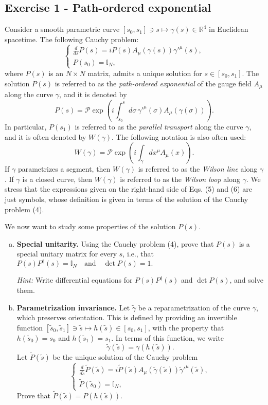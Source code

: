 \documentclass[10pt,a4paper]{article}
\theoremstyle{definition}
\begin{document}
\subsection{Exercise 1 - Path-ordered exponential}
{\color{blue}
Consider a smooth parametric curve $[s_0, s_1] \ni s \mapsto \gamma(s) \in \mathbb{R}^4$ in Euclidean spacetime. The following Cauchy problem:
\[
\begin{cases}
\displaystyle \frac{d}{ds} P(s) = i P(s) A_\mu(\gamma(s)) \gamma'^\mu(s), \\
P(s_0) = \mathbb{I}_N,
\end{cases}  \tag{4}
\]
where $P(s)$ is an $N \times N$ matrix, admits a unique solution for $s \in [s_0, s_1] $. The solution $P(s)$ is referred to as the \textit{path-ordered exponential} of the gauge field $A_\mu$ along the curve $\gamma$, and it is denoted by
\[
P(s) = \mathcal{P} \exp\left( i \int_{s_0}^s d\sigma\, \gamma'^\mu(\sigma) A_\mu(\gamma(\sigma)) \right). \tag{5}
\]
In particular, $P(s_1)$ is referred to as the \textit{parallel transport} along the curve $\gamma$, and it is often denoted by $W(\gamma)$. The following notation is also often used:
\[
W(\gamma) = \mathcal{P} \exp\left( i \int_{\gamma} dx^\mu A_\mu(x) \right). \tag{6}
\]
If $\gamma$ parametrizes a segment, then $W(\gamma)$ is referred to as the \textit{Wilson line} along $\gamma$. If $\gamma$ is a closed curve, then $W(\gamma)$ is referred to as the \textit{Wilson loop} along $\gamma$. We stress that the expressions given on the right-hand side of Eqs. (5) and (6) are just symbols, whose definition is given in terms of the solution of the Cauchy problem (4).

We now want to study some properties of the solution $P(s)$.
\begin{enumerate}[a.)]
\item \textbf{Special unitarity.} Using the Cauchy problem (4), prove that $P(s)$ is a special unitary matrix for every $s$, i.e., that
$P(s)P^\dagger(s) = \mathbb{I}_N \quad \text{and} \quad \det P(s) = 1.$

\textit{Hint:} Write differential equations for $P(s)P^\dagger(s)$ and $\det P(s)$, and solve them.
\item \textbf{Parametrization invariance.} Let $\tilde{\gamma}$ be a reparametrization of the curve $\gamma$, which preserves orientation. This is defined by providing an invertible function $[\tilde{s}_0, \tilde{s}_1] \ni \tilde{s} \mapsto h(\tilde{s}) \in [s_0, s_1]$, with the property that $ h(\tilde{s}_0) = s_0$ and $h(\tilde{s}_1) = s_1$. In terms of this function, we write
    \[
    \tilde{\gamma}(\tilde{s}) = \gamma(h(\tilde{s})). \tag{7}
    \]
    Let \( \tilde{P}(\tilde{s}) \) be the unique solution of the Cauchy problem
    \[
    \begin{cases}
    \displaystyle \frac{d}{d\tilde{s}} \tilde{P}(\tilde{s}) = i \tilde{P}(\tilde{s}) A_\mu(\tilde{\gamma}(\tilde{s})) \tilde{\gamma}'^\mu(\tilde{s}), \\
    \tilde{P}(\tilde{s}_0) = \mathbb{I}_N,
    \end{cases} \tag{8}
    \]
Prove that $\tilde{P}(\tilde{s}) = P(h(\tilde{s})).$


\end{enumerate}}
\end{document}
